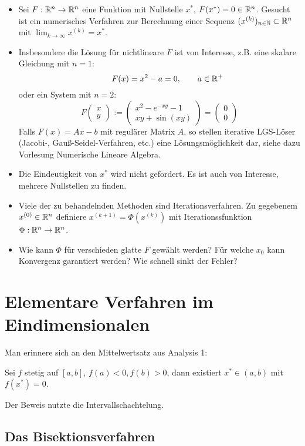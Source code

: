 \documentclass[
]{mycourse}
\begin{document}
\begin{itemize}
	\item
		Sei $F:\mathbb{R}^n \to \mathbb{R}^n$ eine Funktion mit Nullstelle $x^*$, $F(x^*) = 0 \in \mathbb{R}^n$.
		Gesucht ist ein numerisches Verfahren zur Berechnung einer Sequenz $(x^{(k)})_{n\in \mathbb{N}} \subset \mathbb{R}^n$ mit $\lim_{k\to \infty} x^{(k)} = x^*$.
	\item
		Insbesondere die Lösung für nichtlineare $F$ ist von Interesse, z.B. eine skalare Gleichung mit $n=1$:
		\[
			\qquad F(x) = x^2 - a = 0, \qquad a\in \mathbb{R}^+
		\]
		oder ein System mit $n=2$:
		\[
			F \begin{pmatrix}
				x \\ y
			\end{pmatrix}
			:= \begin{pmatrix}
				x^2 - e^{-xy} - 1 \\
				xy + \sin(xy)
			\end{pmatrix}
			= \begin{pmatrix}
				0 \\ 0
			\end{pmatrix}
		\]
		Falls $F(x) = Ax - b$ mit regulärer Matrix $A$, so stellen iterative LGS-Löser (Jacobi-, Gauß-Seidel-Verfahren, etc.) eine Lösungsmöglichkeit dar, siehe dazu Vorlesung Numerische Lineare Algebra.
	\item
		Die Eindeutigkeit von $x^*$ wird nicht gefordert. 
		Es ist auch von Interesse, mehrere Nullstellen zu finden.
	\item
		Viele der zu behandelnden Methoden sind Iterationsverfahren.
		Zu gegebenem $x^{(0)} \in \mathbb{R}^n$ definiere $x^{(k+1)} = \Phi(x^{(k)})$ mit Iterationssfunktion $\Phi : \mathbb{R}^n \to \mathbb{R}^n$.
	\item
		Wie kann $\Phi$ für verschieden glatte $F$ gewählt werden?
		Für welche $x_0$ kann Konvergenz garantiert werden?
		Wie schnell sinkt der Fehler?
\end{itemize}


\section{Elementare Verfahren im Eindimensionalen}


Man erinnere sich an den Mittelwertsatz aus Analysis 1:

Sei $f$ stetig auf $[a,b]$, $f(a) < 0, f(b) > 0$, dann existiert $x^* \in (a,b)$ mit $f(x^*)=0$.

Der Beweis nutzte die Intervallschachtelung.

\subsection{Das Bisektionsverfahren}
\end{document}
